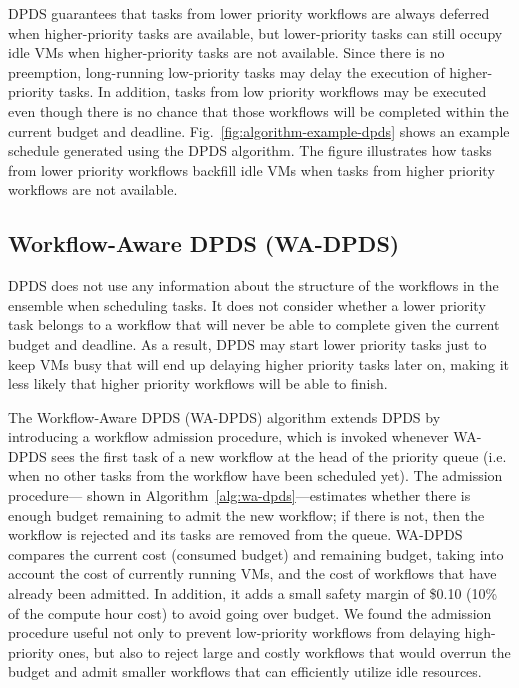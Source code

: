 \documentclass[conference]{IEEEtran}
\begin{document}
DPDS guarantees that tasks from lower priority workflows are always deferred
when higher-priority tasks are available, but lower-priority tasks can still
occupy idle VMs when higher-priority tasks are not available. Since there is
no preemption, long-running low-priority tasks may delay the execution of
higher-priority tasks. In addition, tasks from low priority workflows may be
executed even though there is no chance that those workflows will be completed
within the current budget and deadline. Fig.~\ref{fig:algorithm-example-dpds}
shows an example schedule generated using the DPDS algorithm. The figure
illustrates how tasks from lower priority workflows backfill idle VMs when
tasks from higher priority workflows are not available.


\subsection{Workflow-Aware DPDS (WA-DPDS)}

DPDS does not use any information about the structure of the
workflows in the ensemble when scheduling tasks.  It does not
consider whether a lower priority task belongs to a workflow that will never be
able to complete given the current budget and deadline. As a result, DPDS may
start lower priority tasks just to keep VMs busy that will end up delaying
higher priority tasks later on, making it less likely that higher priority
workflows will be able to finish.

The Workflow-Aware DPDS (WA-DPDS) algorithm extends DPDS by introducing a
workflow admission procedure, which is invoked whenever WA-DPDS sees the first
task of a new workflow at the head of the priority queue (i.e. when no other
tasks from the workflow have been scheduled yet). The admission procedure---
shown in Algorithm~\ref{alg:wa-dpds}---estimates whether there is enough
budget remaining to admit the new workflow; if there is not, then the workflow
is rejected and its tasks are removed from the queue. WA-DPDS compares the
current cost (consumed budget) and remaining budget, taking into account the
cost of currently running VMs, and the cost of workflows that have already
been admitted. In addition, it adds a small safety margin of \$0.10 (10\% of the
compute hour cost) to avoid going over budget. We found the admission procedure useful not only to prevent
low-priority workflows from delaying high-priority ones, but also to reject
large and costly workflows that would overrun the budget and admit smaller
workflows that can efficiently utilize idle resources. 
\end{document}
